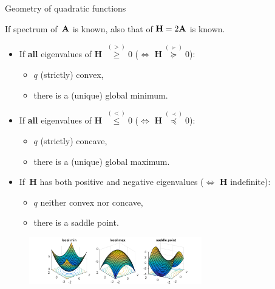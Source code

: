 \documentclass[11pt,compress,t,notes=noshow, xcolor=table]{beamer}
\begin{document}
\begin{vbframe}{Geometry of quadratic functions}
\framebreak

If spectrum of~$\mathbf{A}$ is known, also that of $\mathbf{H} = 2\mathbf{A}$ is known.

\begin{itemize}
    \item If \textbf{all} eigenvalues of $\mathbf{H}$ $\overset{(>)}{\geq} 0$ ($\Leftrightarrow$ $\mathbf{H} \overset{(\succ)}{\succcurlyeq} 0$):
        \begin{itemize} 
            \item $q$ (strictly) convex,
            \item there is a (unique) global minimum. 
        \end{itemize}
    \item If \textbf{all} eigenvalues of $\mathbf{H}$ $\overset{(<)}{\leq} 0$ ($\Leftrightarrow$ $\mathbf{H} \overset{(\prec)}{\preccurlyeq} 0$):
        \begin{itemize} 
            \item $q$ (strictly) concave,
            \item there is a (unique) global maximum. 
        \end{itemize}
    \item If~$\mathbf{H}$ has both positive and negative eigenvalues ($\Leftrightarrow$ $\mathbf{H}$ indefinite):
        \begin{itemize}
            \item $q$ neither convex nor concave,
            \item there is a saddle point.
        \end{itemize}
\end{itemize}


\begin{figure}
    \centering
    \includegraphics[width=0.67\textwidth]{figure_man/minmaxsaddle.png}
\end{figure}

\end{vbframe}
\end{document}
